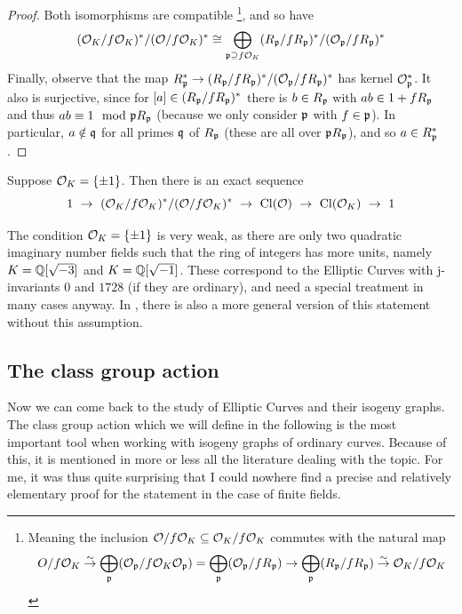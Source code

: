 \begin{proof}
    Both isomorphisms are compatible
    \footnote{Meaning the inclusion $\mathcal{O}/f\mathcal{O}_K \subseteq \mathcal{O}_K/f\mathcal{O}_K$ commutes with the natural map
    \begin{equation*}
        O/f\mathcal{O}_K \overset{\sim}{\to} \bigoplus_{\mathfrak{p}} (\mathcal{O}_{\mathfrak{p}}/f\mathcal{O}_K\mathcal{O}_{\mathfrak{p}}) = \bigoplus_{\mathfrak{p}} (\mathcal{O}_{\mathfrak{p}}/fR_{\mathfrak{p}}) \to \bigoplus_{\mathfrak{p}} (R_{\mathfrak{p}}/fR_{\mathfrak{p}}) \overset{\sim}{\to} \mathcal{O}_K/f\mathcal{O}_K
    \end{equation*}
    }, 
    and so have
    \begin{equation*}
        (\mathcal{O}_K/f\mathcal{O}_K)^*/(\mathcal{O}/f\mathcal{O}_K)^* \cong \bigoplus_{\mathfrak{p} \supseteq f\mathcal{O}_K} (R_{\mathfrak{p}}/fR_{\mathfrak{p}})^*/(\mathcal{O}_{\mathfrak{p}}/fR_{\mathfrak{p}})^*
    \end{equation*}
    Finally, observe that the map $R_{\mathfrak{p}}^* \to (R_{\mathfrak{p}}/fR_{\mathfrak{p}})^*/(\mathcal{O}_{\mathfrak{p}}/fR_{\mathfrak{p}})^*$ has kernel $\mathcal{O}_{\mathfrak{p}}^*$.
    It also is surjective, since for $[a] \in (R_{\mathfrak{p}}/fR_{\mathfrak{p}})^*$ there is $b \in R_{\mathfrak{p}}$ with $ab \in 1 + fR_{\mathfrak{p}}$ and thus $ab \equiv 1 \mod {\mathfrak{p}} R_{\mathfrak{p}}$ (because we only consider $\mathfrak{p}$ with $f \in \mathfrak{p}$).
    In particular, $a \notin \mathfrak{q}$ for all primes $\mathfrak{q}$ of $R_{\mathfrak{p}}$ (these are all over $\mathfrak{p} R_{\mathfrak{p}}$), and so $a \in R_{\mathfrak{p}}^*$.
\end{proof}
\begin{corollary}
    \label{prop:class_group_order}
    Suppose $\mathcal{O}_K = \{ \pm 1 \}$. Then there is an exact sequence
    \begin{equation*}
        1 \ \to \ (\O_K/f\O_K)^*/(\O/f\O_K)^* \ \to \ \Cl(\O) \ \to \ \Cl(\O_K) \ \to \ 1
    \end{equation*}
\end{corollary}
The condition $\mathcal{O}_K = \{ \pm 1 \}$ is very weak, as there are only two quadratic imaginary number fields such that the ring of integers has more units, namely $K = \mathbb{Q}[\sqrt{-3}]$ and $K = \mathbb{Q}[\sqrt{-1}]$.
These correspond to the Elliptic Curves with j-invariants $0$ and $1728$ (if they are ordinary), and need a special treatment in many cases anyway.
In \cite{neukirch}, there is also a more general version of this statement without this assumption.

\subsection{The class group action}
Now we can come back to the study of Elliptic Curves and their isogeny graphs.
The class group action which we will define in the following is the most important tool when working with isogeny graphs of ordinary curves.
Because of this, it is mentioned in more or less all the literature dealing with the topic.
For me, it was thus quite surprising that I could nowhere find a precise and relatively elementary proof for the statement in the case of finite fields.

